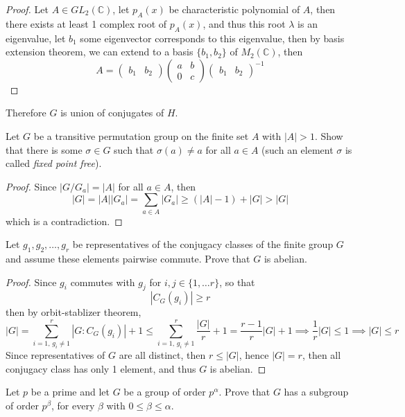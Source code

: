 \documentclass{article}
\newcommand{\C}{\mathbb{C}}
\newenvironment{problem}[2][Problem]{\begin{trivlist}
\item[\hskip \labelsep {\bfseries #1}\hskip \labelsep {\bfseries #2.}]}{\end{trivlist}}
\begin{document}
\begin{proof}
    Let $A\in GL_2(\C)$, let $p_A(x)$ be characteristic polynomial of $A$, then there exists at least 1 complex root of $p_A(x)$, and thus this root $\lambda$ is an eigenvalue, let $b_1$ some eigenvector corresponds to this eigenvalue, then by basis extension theorem, we can extend to a basis $\{b_1, b_2\}$ of $M_2(\C)$, then 
    \[
        A = \begin{pmatrix}
            b_1 & b_2
        \end{pmatrix}\begin{pmatrix}
            a & b\\
            0 & c
        \end{pmatrix}\begin{pmatrix}
            b_1 & b_2
        \end{pmatrix}^{-1}
    \]
\end{proof}
Therefore $G$ is union of conjugates of $H$.
\begin{problem}{26}
    Let \( G \) be a transitive permutation group on the finite set \( A \) with \( |A| > 1 \). Show that there is some \( \sigma \in G \) such that \( \sigma(a) \neq a \) for all \( a \in A \) (such an element \( \sigma \) is called \textit{fixed point free}).
\end{problem}
\begin{proof}
    Since $|G/G_a|=|A|$ for all $a \in A$, then 
    \[|G|=|A||G_a|=\sum_{a \in A} |G_a|\geq (|A|-1)+|G|>|G|\]
    which is a contradiction.
\end{proof}
\begin{problem}{27}
    Let \( g_1, g_2, \dots, g_r \) be representatives of the conjugacy classes of the finite group \( G \) and assume these elements pairwise commute. Prove that \( G \) is abelian.
\end{problem}
\begin{proof}
    Since $g_i$ commutes with $g_j$ for $i, j \in \{1, \dots r\}$, so that 
    \[
        |C_G(g_i)|\geq r
    \]
    then by orbit-stablizer theorem, 
    \[
        |G|=\sum_{i=1,\, g_i \neq 1}^r|G:C_G(g_i)|+1\leq \sum_{i=1,\, g_i \neq 1}^r\frac{|G|}{r}+1=\frac{r-1}{r}|G|+1\implies \frac{1}{r}|G|\leq 1\implies |G|\leq r
    \]
    Since representatives of $G$ are all distinct, then $r \leq |G|$, hence $|G|=r$, then all conjugacy class has only 1 element, and thus $G$ is abelian.
\end{proof}
\begin{problem}{29}
    Let \( p \) be a prime and let \( G \) be a group of order \( p^\alpha \). Prove that \( G \) has a subgroup of order \( p^\beta \), for every \( \beta \) with \( 0 \leq \beta \leq \alpha \).
\end{problem}
\end{document}
